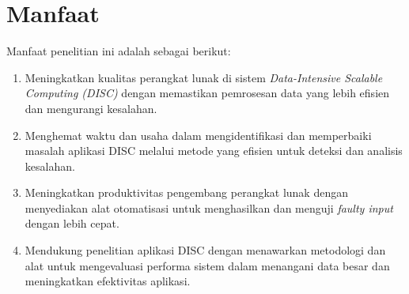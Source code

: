 \section{Manfaat}
\label{sec:Manfaat}

Manfaat penelitian ini adalah sebagai berikut:

\begin{enumerate}[nolistsep]
  \item Meningkatkan kualitas perangkat lunak di sistem \emph{Data-Intensive Scalable Computing (DISC)} dengan memastikan pemrosesan data yang lebih efisien dan mengurangi kesalahan.
  
  \item Menghemat waktu dan usaha dalam mengidentifikasi dan memperbaiki masalah aplikasi DISC melalui metode yang efisien untuk deteksi dan analisis kesalahan.
  
  \item Meningkatkan produktivitas pengembang perangkat lunak dengan menyediakan alat otomatisasi untuk menghasilkan dan menguji \emph{faulty input} dengan lebih cepat.
  
  \item Mendukung penelitian aplikasi DISC dengan menawarkan metodologi dan alat untuk mengevaluasi performa sistem dalam menangani data besar dan meningkatkan efektivitas aplikasi.
  \end{enumerate}
